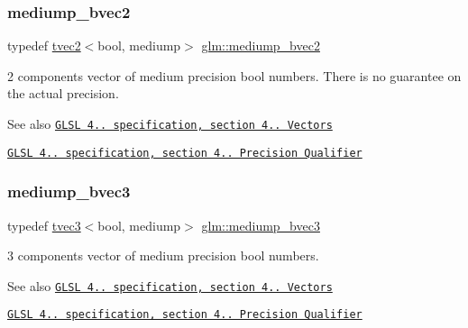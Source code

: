 \subsubsection{\texorpdfstring{mediump\+\_\+bvec2}{mediump\_bvec2}}
{\footnotesize\ttfamily typedef \hyperlink{structglm_1_1tvec2}{tvec2}$<$bool, mediump$>$ \hyperlink{group__core__precision_gaf46a55555e71730f77b5c885d20ae8e2}{glm\+::mediump\+\_\+bvec2}}

2 components vector of medium precision bool numbers. There is no guarantee on the actual precision.

\begin{DoxySeeAlso}{See also}
\href{http://www.opengl.org/registry/doc/GLSLangSpec.4.20.8.pdf}{\tt G\+L\+SL 4.. specification, section 4.. Vectors} 

\href{http://www.opengl.org/registry/doc/GLSLangSpec.4.20.8.pdf}{\tt G\+L\+SL 4.. specification, section 4.. Precision Qualifier} 
\end{DoxySeeAlso}
\mbox{\label{group__core__precision_ga39d35dfb49fff9cf4a6458d8027d2a8b}} 
\subsubsection{\texorpdfstring{mediump\+\_\+bvec3}{mediump\_bvec3}}
{\footnotesize\ttfamily typedef \hyperlink{structglm_1_1tvec3}{tvec3}$<$bool, mediump$>$ \hyperlink{group__core__precision_ga39d35dfb49fff9cf4a6458d8027d2a8b}{glm\+::mediump\+\_\+bvec3}}

3 components vector of medium precision bool numbers.

\begin{DoxySeeAlso}{See also}
\href{http://www.opengl.org/registry/doc/GLSLangSpec.4.20.8.pdf}{\tt G\+L\+SL 4.. specification, section 4.. Vectors} 

\href{http://www.opengl.org/registry/doc/GLSLangSpec.4.20.8.pdf}{\tt G\+L\+SL 4.. specification, section 4.. Precision Qualifier} 
\end{DoxySeeAlso}
\mbox{\label{group__core__precision_ga92b3f3ba6ecceaea364906ad7ee985a5}} 
